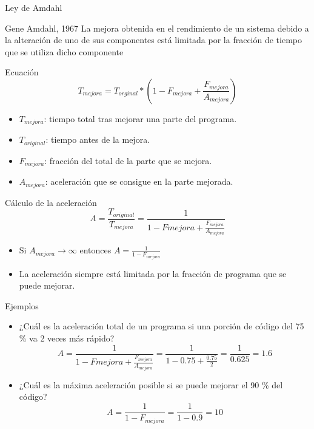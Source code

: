 \documentclass[utf8]{beamer}
\begin{document}
\begin{frame}[allowframebreaks]{Ley de Amdahl}
    \begin{block}{Gene Amdahl, 1967}
        La mejora obtenida en el rendimiento de un sistema debido a la alteración de uno de sus componentes está limitada por la fracción de tiempo que se utiliza dicho componente
    \end{block}
    \begin{block}{Ecuación}
        $$ T_{mejora} = T_{orginal} * (1 - F_{mejora} + \frac{F_{mejora}}{A_{mejora}}) $$
        \begin{itemize}
            \item $T_{mejora}$: tiempo total tras mejorar una parte del programa.
            \item $T_{original}$: tiempo antes de la mejora.
            \item $F_{mejora}$: fracción del total de la parte que se mejora.
            \item $A_{mejora}$: aceleración que se consigue en la parte mejorada.
        \end{itemize}
    \end{block}
    \begin{block}{Cálculo de la aceleración}
        $$ A = \frac{T_{original}}{T_{mejora}} = \frac{1}{1-F{mejora}+\frac{F_{mejora}}{A_{mejora}}} $$
        \begin{itemize}
        \item Si $A_{mejora} \rightarrow \infty$ entonces $A = \frac{1}{1 - F_{mejora}}$ \\
        \item La aceleración siempre está limitada por la fracción de programa que se puede mejorar.
        \end{itemize}
    \end{block}
    \begin{block}{Ejemplos}
        \begin{itemize}
        \item ¿Cuál es la aceleración total de un programa si una porción de código del 75 \% va 2 veces más rápido?
        $$ A = \frac{1}{1-F{mejora}+\frac{F_{mejora}}{A_{mejora}}} = \frac{1}{1 - 0.75 + \frac{0.75}{2}} = \frac{1}{0.625} = 1.6 $$
        \item ¿Cuál es la máxima aceleración posible si se puede mejorar el 90 \% del código?
        $$ A = \frac{1}{1 - F_{mejora}} = \frac{1}{1 - 0.9} = 10 $$
        \end{itemize}
    \end{block}

\end{frame}
\end{document}
